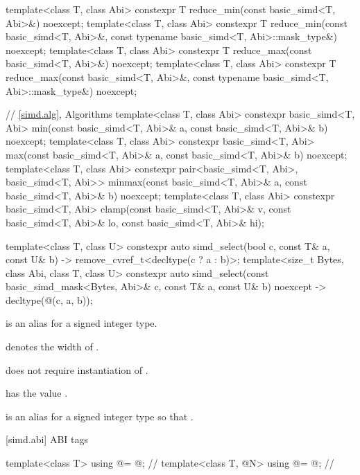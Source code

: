 \begin{codeblock}
{  template<class T, class Abi>
    constexpr T reduce_min(const basic_simd<T, Abi>&) noexcept;
  template<class T, class Abi>
    constexpr T reduce_min(const basic_simd<T, Abi>&,
                           const typename basic_simd<T, Abi>::mask_type&) noexcept;
  template<class T, class Abi>
    constexpr T reduce_max(const basic_simd<T, Abi>&) noexcept;
  template<class T, class Abi>
    constexpr T reduce_max(const basic_simd<T, Abi>&,
                           const typename basic_simd<T, Abi>::mask_type&) noexcept;

  // \ref{simd.alg}, Algorithms
  template<class T, class Abi>
    constexpr basic_simd<T, Abi>
      min(const basic_simd<T, Abi>& a, const basic_simd<T, Abi>& b) noexcept;
  template<class T, class Abi>
    constexpr basic_simd<T, Abi>
      max(const basic_simd<T, Abi>& a, const basic_simd<T, Abi>& b) noexcept;
  template<class T, class Abi>
    constexpr pair<basic_simd<T, Abi>, basic_simd<T, Abi>>
      minmax(const basic_simd<T, Abi>& a, const basic_simd<T, Abi>& b) noexcept;
  template<class T, class Abi>
    constexpr basic_simd<T, Abi>
      clamp(const basic_simd<T, Abi>& v, const basic_simd<T, Abi>& lo,
            const basic_simd<T, Abi>& hi);

  template<class T, class U>
    constexpr auto simd_select(bool c, const T& a, const U& b)
    -> remove_cvref_t<decltype(c ? a : b)>;
  template<size_t Bytes, class Abi, class T, class U>
    constexpr auto simd_select(const basic_simd_mask<Bytes, Abi>& c, const T& a, const U& b)
    noexcept -> decltype(@\simdselect@(c, a, b));
}
\end{codeblock}

\pnum
\simdsizetype{} is an alias for a signed integer type.

\pnum
{} denotes the width of .
\begin{note}
   does not require instantiation of .
\end{note}

\pnum
{} has the value .

\pnum
{} is an alias for a signed integer type  so that .

[simd.abi]{ ABI tags}

\begin{codeblock}
template<class T> using @\nativeabi@ = @\seebelow@; // \expos
template<class T, @\simdsizetype@ N> using @\deducet@ = @\seebelow@; // \expos
\end{codeblock}

